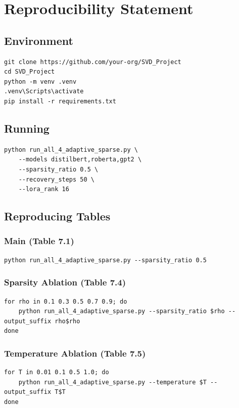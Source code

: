 
\section{Reproducibility Statement}

\subsection{Environment}

\begin{lstlisting}
git clone https://github.com/your-org/SVD_Project
cd SVD_Project
python -m venv .venv
.venv\Scripts\activate
pip install -r requirements.txt
\end{lstlisting}

\subsection{Running}

\begin{lstlisting}
python run_all_4_adaptive_sparse.py \
    --models distilbert,roberta,gpt2 \
    --sparsity_ratio 0.5 \
    --recovery_steps 50 \
    --lora_rank 16
\end{lstlisting}

\subsection{Reproducing Tables}

\subsubsection{Main (Table 7.1)}
\begin{lstlisting}
python run_all_4_adaptive_sparse.py --sparsity_ratio 0.5
\end{lstlisting}

\subsubsection{Sparsity Ablation (Table 7.4)}
\begin{lstlisting}
for rho in 0.1 0.3 0.5 0.7 0.9; do
    python run_all_4_adaptive_sparse.py --sparsity_ratio $rho --output_suffix rho$rho
done
\end{lstlisting}

\subsubsection{Temperature Ablation (Table 7.5)}
\begin{lstlisting}
for T in 0.01 0.1 0.5 1.0; do
    python run_all_4_adaptive_sparse.py --temperature $T --output_suffix T$T
done
\end{lstlisting}

